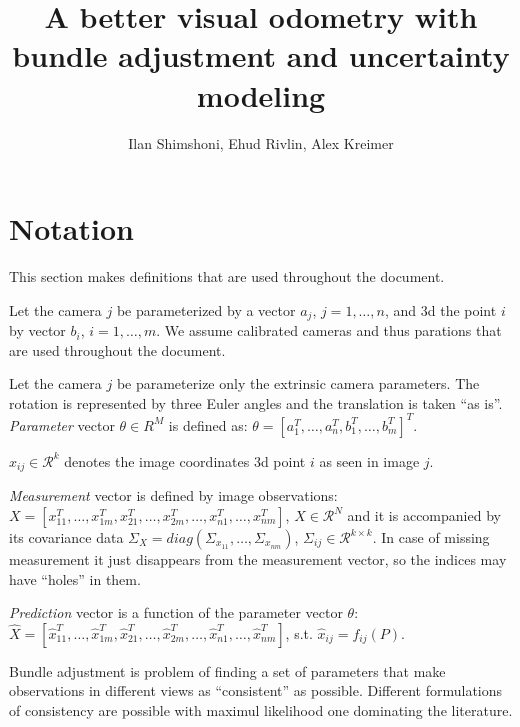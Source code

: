 \documentclass[10pt]{article}         %
\title{A better visual odometry with bundle adjustment and uncertainty modeling}
\author{Ilan Shimshoni, Ehud Rivlin, Alex Kreimer}
\begin{document}
\maketitle


\section{Notation}

This section makes definitions that are used throughout the document.

Let the camera $j$ be parameterized by a vector $a_j$, $j=1,\dotsc,n$,
and 3d the point $i$ by vector $b_i$, $i=1,\dotsc,m$.  We assume
calibrated cameras and thus parations that are used throughout the document.

Let the camera $j$ be parameterize only the extrinsic camera
parameters.  The rotation is represented by three Euler angles and the
translation is taken ``as is''. \emph{Parameter} vector
$\theta\in R^M$ is defined as:
$\theta=[a_1^T,\dotsc,a_n^T,b_1^T, \dotsc,b_m^T]^T$.

$x_{ij}\in\mathcal{R}^k$ denotes the image coordinates 3d point $i$ as
seen in image $j$.

\emph{Measurement} vector is defined by image observations:
$X = [x_{11}^T,\dotsc, x_{1m}^T,\allowbreak
x_{21}^T,\dotsc,x_{2m}^T,\dotsc,x_{n1}^T,\dotsc,x_{nm}^T]$,
$X\in\mathcal{R}^N$ and it is accompanied by its covariance data
$\Sigma_X=diag(\Sigma_{x_{11}},\dotsc,\Sigma_{x_{nm}})$,
$\Sigma_{ij}\in \mathcal{R}^{k\times k}$. In case of missing
measurement it just disappears from the measurement vector, so the
indices may have ``holes'' in them.

\emph{Prediction} vector is a function of the parameter vector $\theta$:
$\hat{X} = [\hat{x}_{11}^T,\dotsc,\hat{x}_{1m}^T,\allowbreak
\hat{x}_{21}^T,\dotsc,\allowbreak
\hat{x}_{2m}^T,\dotsc,\hat{x}_{n1}^T,\dotsc,\hat{x}_{nm}^T]$,
s.t. $\hat{x}_{ij} =f_{ij}(P)$.

Bundle adjustment is problem of finding a set of parameters that make
observations in different views as ``consistent'' as possible.
Different formulations of consistency are possible with maximul
likelihood one dominating the literature.
\end{document}
